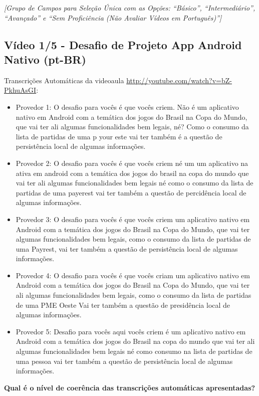 \noindent
\textit{[Grupo de Campos para Seleção Única com as Opções: ``Básico'', ``Intermediário'', ``Avançado'' e ``Sem Proficiência (Não Avaliar Vídeos em Português)'']}

\subsection{Vídeo 1/5 - Desafio de Projeto App Android Nativo (pt-BR)}

\noindent
Transcrições Automáticas da videoaula \url{http://youtube.com/watch?v=bZ-PkhuAsGI}:

\begin{itemize}
    \item Provedor 1: O desafio para vocês é que vocês criem. Não é um aplicativo nativo em Android com a temática dos jogos do Brasil na Copa do Mundo, que vai ter ali algumas funcionalidades bem legais, né? Como o consumo da lista de partidas de uma p your este vai ter também é a questão de persistência local de algumas informações.
    \item Provedor 2: O desafio para vocês é que vocês criem né um um aplicativo na ativa em android com a temática dos jogos do brasil na copa do mundo que vai ter ali algumas funcionalidades bem legais né como o consumo da lista de partidas de uma payerest vai ter também a questão de percidência local de algumas informações.
    \item Provedor 3: O desafio para vocês é que vocês criem um aplicativo nativo em Android com a temática dos jogos do Brasil na Copa do Mundo, que vai ter algumas funcionalidades bem legais, como o consumo da lista de partidas de uma Payrest, vai ter também a questão de persistência local de algumas informações.
    \item Provedor 4: O desafio para vocês é que vocês criam um aplicativo nativo em Android com a temática dos jogos do Brasil na Copa do Mundo, que vai ter ali algumas funcionalidades bem legais, como o consumo da lista de partidas de uma PME Oeste Vai ter também a questão de presidência local de algumas informações.
    \item Provedor 5: Desafio para vocês aqui vocês criem é um aplicativo nativo em Android com a temática dos jogos do Brasil na copa do mundo que vai ter ali algumas funcionalidades bem legais né como consumo na lista de partidas de uma pessoa vai ter também a questão de persistência local de algumas informações.
\end{itemize}

\noindent
\textbf{Qual é o nível de coerência das transcrições automáticas apresentadas?}

